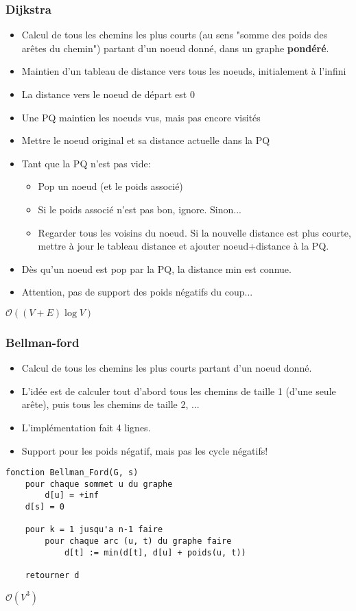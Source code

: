 \documentclass[8pt,aspectratio=169]{beamer}
\begin{document}
\begin{frame}
\frametitle{Dijkstra}
\begin{itemize}
	\item Calcul de tous les chemins les plus courts (au sens "somme des poids des arêtes du chemin") partant d'un noeud donné, dans un graphe \textbf{pondéré}.
	\item Maintien d'un tableau de distance vers tous les noeuds, initialement à l'infini
	\item La distance vers le noeud de départ est 0
	\item Une PQ maintien les noeuds vus, mais pas encore visités
	\item Mettre le noeud original et sa distance actuelle dans la PQ
	\item Tant que la PQ n'est pas vide:
	\begin{itemize}
		\item Pop un noeud (et le poids associé)
		\item Si le poids associé n'est pas bon, ignore. Sinon...
		\item Regarder tous les voisins du noeud. Si la nouvelle distance est plus courte, mettre à jour le tableau distance et ajouter noeud+distance à la PQ.
	\end{itemize}
	\item Dès qu'un noeud est pop par la PQ, la distance min est connue.
	\item Attention, pas de support des poids négatifs du coup...
\end{itemize}
$\mathcal{O}((V+E)\log V)$
\end{frame}

\begin{frame}[fragile]
\frametitle{Bellman-ford}
\begin{itemize}
	\item Calcul de tous les chemins les plus courts partant d'un noeud donné.
	\item L'idée est de calculer tout d'abord tous les chemins de taille 1 (d'une seule arête), puis tous les chemins de taille 2, ...
	\item L'implémentation fait 4 lignes.
	\item Support pour les poids négatif, mais pas les cycle négatifs!
\end{itemize}

\begin{lstlisting}
fonction Bellman_Ford(G, s) 
	pour chaque sommet u du graphe
		d[u] = +inf
	d[s] = 0

	pour k = 1 jusqu'a n-1 faire
		pour chaque arc (u, t) du graphe faire
			d[t] := min(d[t], d[u] + poids(u, t))
	
	retourner d
\end{lstlisting}
$\mathcal{O}(V^3)$
\end{frame}
\end{document}
